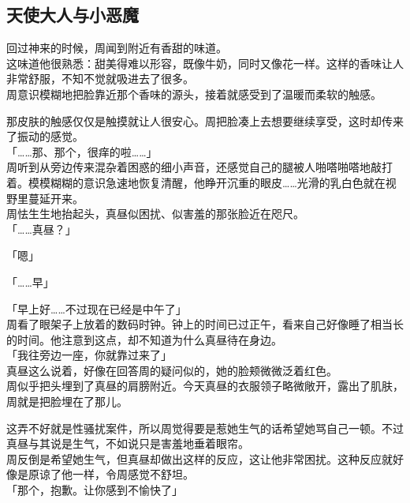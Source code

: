 \subsection{天使大人与小恶魔}

回过神来的时候，周闻到附近有香甜的味道。\\

这味道他很熟悉：甜美得难以形容，既像牛奶，同时又像花一样。这样的香味让人非常舒服，不知不觉就吸进去了很多。\\

周意识模糊地把脸靠近那个香味的源头，接着就感受到了温暖而柔软的触感。

那皮肤的触感仅仅是触摸就让人很安心。周把脸凑上去想要继续享受，这时却传来了振动的感觉。\\

「……那、那个，很痒的啦……」\\

周听到从旁边传来混杂着困惑的细小声音，还感觉自己的腿被人啪嗒啪嗒地敲打着。模模糊糊的意识急速地恢复清醒，他睁开沉重的眼皮……光滑的乳白色就在视野里蔓延开来。\\

周怯生生地抬起头，真昼似困扰、似害羞的那张脸近在咫尺。\\

「……真昼？」

「嗯」

「……早」

「早上好……不过现在已经是中午了」\\

周看了眼架子上放着的数码时钟。钟上的时间已过正午，看来自己好像睡了相当长的时间。他注意到这点，却不知道为什么真昼待在身边。\\

「我往旁边一座，你就靠过来了」\\

真昼这么说着，好像在回答周的疑问似的，她的脸颊微微泛着红色。\\

周似乎把头埋到了真昼的肩膀附近。今天真昼的衣服领子略微敞开，露出了肌肤，周就是把脸埋在了那儿。

这弄不好就是性骚扰案件，所以周觉得要是惹她生气的话希望她骂自己一顿。不过真昼与其说是生气，不如说只是害羞地垂着眼帘。\\

周反倒是希望她生气，但真昼却做出这样的反应，这让他非常困扰。这种反应就好像是原谅了他一样，令周感觉不舒坦。\\

「那个，抱歉。让你感到不愉快了」

